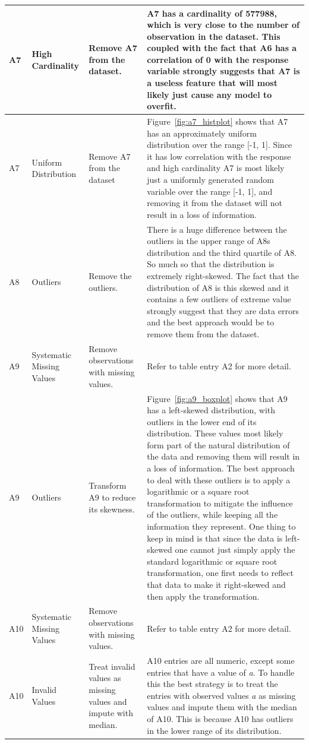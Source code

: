 \documentclass[11pt]{report}
\begin{document}
\begin{longtable}{p{2cm}p{3cm}p{4cm}p{6cm}}
\midrule
A7 & High Cardinality & Remove A7 from the dataset. & A7 has a cardinality of 577988, which is very close to the number of observation in the dataset. This coupled with the fact that A6 has a correlation of 0 with the response variable strongly suggests that A7 is a useless feature that will most likely just cause any model to overfit. \\
\midrule
A7 & Uniform Distribution & Remove A7 from the dataset & Figure~\ref{fig:a7_histplot} shows that A7 has an approximately uniform distribution over the range [-1, 1]. Since it has low correlation with the response and high cardinality A7 is most likely just a uniformly generated random variable over the range [-1, 1], and removing it from the dataset will not result in a loss of information. \\
\midrule
A8 & Outliers & Remove the outliers. & There is a huge difference between the outliers in the upper range of A8s distribution and the third quartile of A8. So much so that the distribution is extremely right-skewed. The fact that the distribution of A8 is this skewed and it contains a few outliers of extreme value strongly suggest that they are data errors and the best approach would be to remove them from the dataset. \\
\midrule
A9 & Systematic Missing Values & Remove observations with missing values. & Refer to table entry A2 for more detail. \\
\midrule
A9 & Outliers & Transform A9 to reduce its skewness. & Figure~\ref{fig:a9_boxplot} shows that A9 has a left-skewed distribution, with outliers in the lower end of its distribution. These values most likely form part of the natural distribution of the data and removing them will result in a loss of information. The best approach to deal with these outliers is to apply a logarithmic or a square root transformation to mitigate the influence of the outliers, while keeping all the information they represent. One thing to keep in mind is that since the data is left-skewed one cannot just simply apply the standard logarithmic or square root transformation, one first needs to reflect that data to make it right-skewed and then apply the transformation. \\
\midrule
A10 & Systematic Missing Values & Remove observations with missing values. & Refer to table entry A2 for more detail. \\
\midrule
A10 & Invalid Values & Treat invalid values as missing values and impute with median. & A10 entries are all numeric, except some entries that have a value of \textit{a}. To handle this the best strategy is to treat the entries with observed values \textit{a} as missing values and impute them with the median of A10. This is because A10 has outliers in the lower range of its distribution. \\

\end{longtable}
\end{document}
